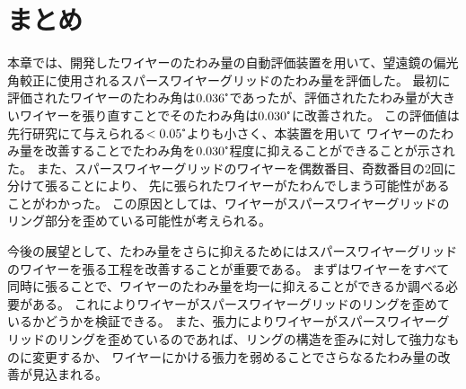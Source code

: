 \documentclass[../../main.tex]{subfiles}
\begin{document}
\section{まとめ}
本章では、開発したワイヤーのたわみ量の自動評価装置を用いて、望遠鏡の偏光角較正に使用されるスパースワイヤーグリッドのたわみ量を評価した。
最初に評価されたワイヤーのたわみ角は$0.036\tcdegree$であったが、評価されたたわみ量が大きいワイヤーを張り直すことでそのたわみ角は$0.030\tcdegree$に改善された。
この評価値は先行研究にて与えられる$<0.05\tcdegree$よりも小さく、本装置を用いて
ワイヤーのたわみ量を改善することでたわみ角を$0.030\tcdegree$程度に抑えることができることが示された。
また、スパースワイヤーグリッドのワイヤーを偶数番目、奇数番目の2回に分けて張ることにより、
先に張られたワイヤーがたわんでしまう可能性があることがわかった。
この原因としては、ワイヤーがスパースワイヤーグリッドのリング部分を歪めている可能性が考えられる。

今後の展望として、たわみ量をさらに抑えるためにはスパースワイヤーグリッドのワイヤーを張る工程を改善することが重要である。
まずはワイヤーをすべて同時に張ることで、ワイヤーのたわみ量を均一に抑えることができるか調べる必要がある。
これによりワイヤーがスパースワイヤーグリッドのリングを歪めているかどうかを検証できる。
また、張力によりワイヤーがスパースワイヤーグリッドのリングを歪めているのであれば、リングの構造を歪みに対して強力なものに変更するか、
ワイヤーにかける張力を弱めることでさらなるたわみ量の改善が見込まれる。
\end{document}
